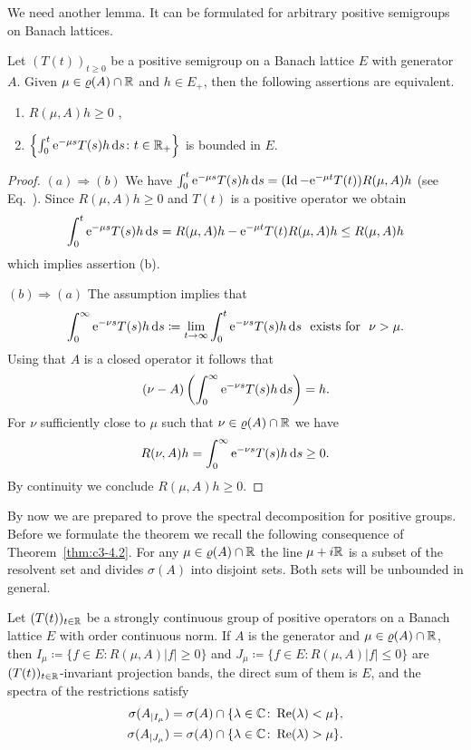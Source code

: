 We need another lemma. It can be formulated for arbitrary positive
semigroups on Banach lattices.
\begin{lemma}\label{lem:c3-4.7}
Let $(T(t))_{t \geq 0}$ be a positive semigroup on a Banach
lattice $E$ with generator $A$. Given $\mu \in \rho(A) \cap \R $ and $h \in E_+$, then the following assertions are equivalent.
\begin{enumerate}[\upshape (a)]
	\item 
	$R(\mu,A)h \geq 0$ , 

	\item 
	$\left\{\int_{0}^{t} \mathrm{e}^{-\mu s}T(s)h \mathop{}\!\mathrm{d}{s} \colon t \in \mathbb{R} _+\right\}$ is bounded in $E$.
\end{enumerate}
\end{lemma}
\begin{proof}
$(a)\Rightarrow(b)$  We have
$\int_{0}^{t} \mathrm{e}^{-\mu s}T(s)h \mathop{}\!\mathrm{d}{s} = (\operatorname{Id} - \mathrm{e}^{-\mu t}T(t))R(\mu,A)h$ 
(see Eq.~).
%
Since $R(\mu,A)h \geq 0$ and $T(t)$ is a positive operator we obtain
\[%
\int_{0}^{t} \eu^{-\mu s}T(s)h \ds = R(\mu,A)h - \eu^{-\mu t}T(t)R(\mu,A)h \leq R(\mu,A)h
\] 
which implies assertion (b).

$(b)\Rightarrow(a)$  The assumption implies that 
\[%
\int_{0}^{\infty} \eu^{-\nu s}T(s)h \ds \coloneq 
\lim_{t \to \infty} \int_{0}^{t} \eu^{-\nu s}T(s)h \ds \ \text{ exists for } \ \nu > \mu . 
\]
Using that $A$ is a closed operator it follows that 
\[%
(\nu - A)\left(\int_{0}^{\infty} \eu^{-\nu s}T(s)h \ds\right) = h .
\]
For $\nu$
sufficiently close to $\mu$ such that $\nu \in \rho(A) \cap \R $ we have 
\[%
R(\nu,A)h = \int_{0}^{\infty} \eu^{-\nu s}T(s)h \ds \geq 0 . 
\] 
By continuity we conclude $R(\mu,A)h \geq 0$.
\end{proof}
By now we are prepared to prove the spectral decomposition for positive groups. Before we formulate the theorem we recall the following
consequence of Theorem~\ref{thm:c3-4.2}. For any $\mu \in \rho(A) \cap \R $ the line $\mu+i\mathbb{R} $ is a
subset of the resolvent set and divides $\sigma(A)$ into disjoint sets.
Both sets will be unbounded in general.
\begin{theorem} \label{thm:c3-4.8}
Let $(T(t))_{t \in \mathbb{R} }$ be a strongly continuous group of positive
operators on a Banach lattice $E$ with order continuous norm.
If\/ $A$ is the generator and $\mu \in \rho(A) \cap \R $, then
$I_{\mu} \coloneq  \{f \in E \colon R(\mu,A)|f| \geq 0\}$ and $J_{\mu} \coloneq  \{f \in E \colon R(\mu,A)|f| \leq 0\}$
are $(T(t))_{t \in \mathbb{R} }$-invariant projection bands, 
the direct sum of them is $E$, and the spectra of the restrictions satisfy
\begin{align*}
	\sigma(A_{|I_{\mu}}) &= \sigma(A) \cap \{\lambda \in \mathbb{C}  \colon \mathop{}\!\mathrm{Re}(\lambda) < \mu\} ,\\
	\sigma(A_{|J_{\mu}}) &= \sigma(A) \cap \{\lambda \in \mathbb{C}  \colon \mathop{}\!\mathrm{Re}(\lambda) > \mu\} .
\end{align*}
\end{theorem}
